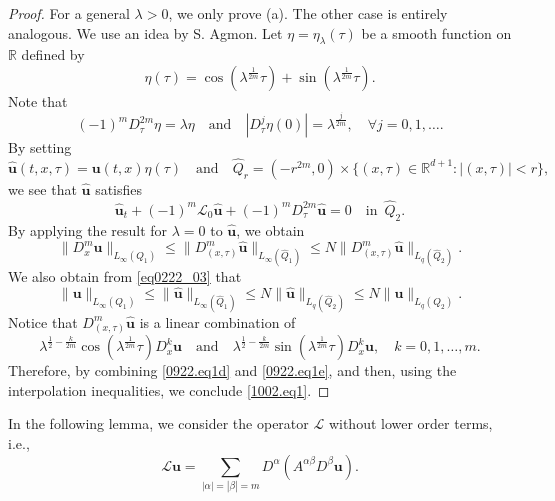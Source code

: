 \documentclass[reqno]{amsart}
\numberwithin{equation}{section}
\theoremstyle{plain}
\theoremstyle{definition}
\theoremstyle{remark}
\begin{document}
\begin{proof}
For a general $\lambda>0$, we only prove (a). The other case is entirely analogous. We use an idea by S. Agmon.
Let $\eta=\eta_\lambda(\tau)$ be a smooth function on ${\mathbb{R}}$ defined by 
\[
\eta(\tau)=\cos(\lambda^{\frac{1}{2m}}\tau)+\sin (\lambda^{\frac{1}{2m}}\tau ).
\]
Note that 
\[
(-1)^m D^{2m}_\tau\eta=\lambda \eta \quad \text{and}\quad |D^j_\tau \eta(0)|=\lambda^{\frac{j}{2m}}, \quad \forall j=0,1,\ldots.
\]
By setting 
\[
\hat{{\boldsymbol{u}}}(t,x,\tau)={\boldsymbol{u}}(t,x)\eta(\tau) \quad \text{and}\quad \widehat{Q}_r=(-r^{2m},0)\times \{(x,\tau)\in {\mathbb{R}}^{d+1}:|(x,\tau)|<r\},
\]
we see that $\hat{{\boldsymbol{u}}}$ satisfies 
\[
\hat{{\boldsymbol{u}}}_t+(-1)^m {\mathcal{L}}_0 \hat{{\boldsymbol{u}}}+(-1)^mD_\tau^{2m}\hat{{\boldsymbol{u}}}=0 \quad \text{in }\, \widehat{Q}_2.
\]
By applying the  result for $\lambda = 0$ to $\hat{{\boldsymbol{u}}}$, we obtain 
\begin{equation}		\label{0922.eq1d}
\|D^m_x {\boldsymbol{u}}\|_{L_\infty(Q_1)}\le\|D^m_{(x,\tau)} \hat{{\boldsymbol{u}}}\|_{L_\infty(\widehat{Q}_1)}\le N\|D^m_{(x,\tau)}\hat{{\boldsymbol{u}}}\|_{L_q(\widehat{Q}_2)}.
\end{equation}
We also obtain from \eqref{eq0222_03} that 
\begin{equation}		\label{0922.eq1e}
\|{\boldsymbol{u}}\|_{L_\infty(Q_1)}\le \|\hat{{\boldsymbol{u}}}\|_{L_\infty(\widehat{Q}_1)}\le N\|\hat{{\boldsymbol{u}}}\|_{L_q(\widehat{Q}_2)}\le N\|{\boldsymbol{u}}\|_{L_q(Q_2)}.
\end{equation}
Notice that $D^m_{(x,\tau)}\hat{{\boldsymbol{u}}}$ is a linear combination of 
\[
\lambda^{\frac{1}{2}-\frac{k}{2m}}\cos (\lambda^{\frac{1}{2m}}\tau)D^k_x{\boldsymbol{u}} \quad \text{and}\quad \lambda^{\frac{1}{2}-\frac{k}{2m}}\sin (\lambda^{\frac{1}{2m}}\tau)D^k_x{\boldsymbol{u}}, \quad k=0,1,\ldots,m.
\]
Therefore, by combining \eqref{0922.eq1d} and \eqref{0922.eq1e}, and then, using the interpolation inequalities, we conclude \eqref{1002.eq1}.
\end{proof}

In the following lemma,  we consider the operator ${\mathcal{L}}$ without lower order terms, i.e., 
\[
{\mathcal{L}} {\boldsymbol{u}}=\sum_{|\alpha|=|\beta|=m}D^\alpha(A^{\alpha\beta}D^\beta {\boldsymbol{u}}).
\]
\end{document}

